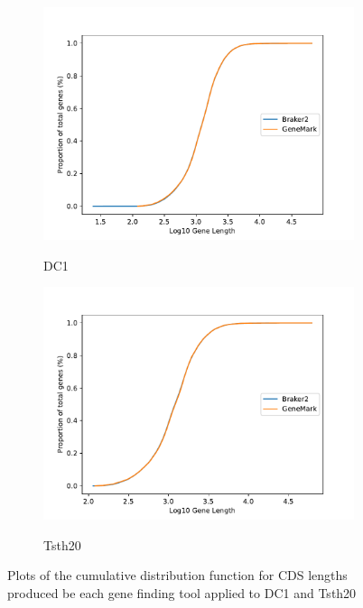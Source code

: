 \begin{figure}
  \centering
  \begin{subfigure}{0.7\textwidth}
    \includegraphics[width=\textwidth]{figures/dc1-cdf-lengths-log.pdf}
    \label{fig:dc1-lengths}
    \caption{DC1}
  \end{subfigure}
  \begin{subfigure}{0.7\textwidth}
    \includegraphics[width=\textwidth]{figures/tsth20-cdf-lengths-log.pdf}
    \label{fig:tsth20-lengths}
    \caption{Tsth20}
  \end{subfigure}
  \caption[CDF plots part 1.]{Plots of the cumulative distribution
    function for CDS lengths produced be each gene finding tool
    applied to DC1 and Tsth20}
  \label{fig:cdf-lengths-1}
\end{figure}

